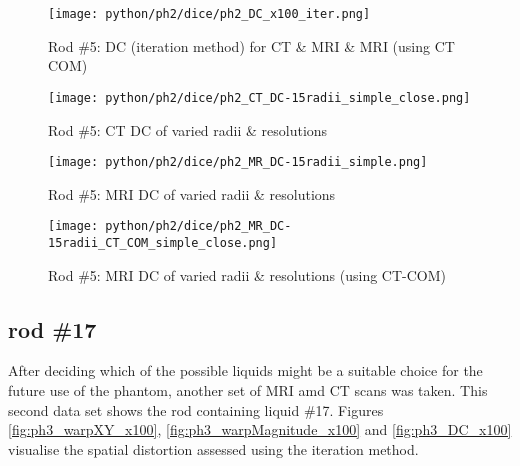\begin{figure}[!bp]
    \centering
    \texttt{[image: python/ph2/dice/ph2\_DC\_x100\_iter.png]}
    \caption{Rod \#5: DC (iteration method) for CT \& MRI \& MRI (using CT COM)}
    \label{fig:ph2_DC_x100}
\end{figure}

\begin{figure}[!bp]
  \centering
  \texttt{[image: python/ph2/dice/ph2\_CT\_DC-15radii\_simple\_close.png]}
  \caption{Rod \#5: CT DC of varied radii \& resolutions}
  \label{fig:ph2_CT_DC-15iter}
\end{figure}

\begin{figure}[!tbp]
  \centering
    \texttt{[image: python/ph2/dice/ph2\_MR\_DC-15radii\_simple.png]}
    \caption{Rod \#5: MRI DC of varied radii \& resolutions}
    \label{fig:ph2_MR_DC-15iter}
\end{figure}

\begin{figure}[!tbp]
      \centering
    \texttt{[image: python/ph2/dice/ph2\_MR\_DC-15radii\_CT\_COM\_simple\_close.png]}
    \caption{Rod \#5: MRI DC of varied radii \& resolutions (using CT-COM)}
    \label{fig:ph2_MR_CT-COM_DC-15iter}
\end{figure}

\clearpage



\subsection{rod \#17}

After deciding which of the possible liquids might be a suitable choice for the future use of the phantom, another set of MRI amd CT scans was taken.
This second data set shows the rod containing liquid \#17.
Figures \ref{fig:ph3_warpXY_x100}, \ref{fig:ph3_warpMagnitude_x100} and \ref{fig:ph3_DC_x100} visualise the spatial distortion assessed using the iteration method.

